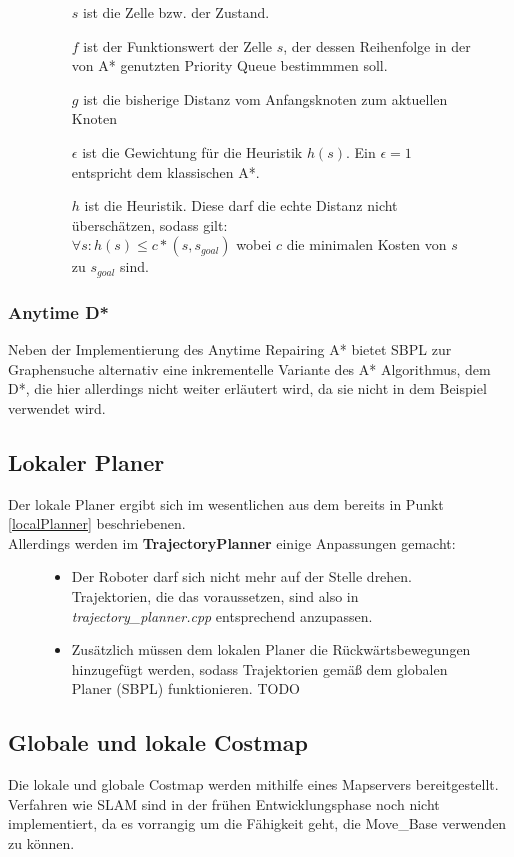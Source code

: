 \documentclass[oribibl]{llncs}
\begin{document}
\begin{figure}
\begin{itemize}
\item [$s$] ist die Zelle bzw. der Zustand.
\item [$f$] ist der Funktionswert der Zelle $s$, der dessen Reihenfolge in der von A* genutzten Priority Queue bestimmmen soll.
\item [$g$] ist die bisherige Distanz vom Anfangsknoten zum aktuellen Knoten
\item [$\epsilon$] ist die Gewichtung für die Heuristik $h(s)$. Ein $\epsilon = 1$ entspricht dem klassischen A*.
\item [$h$] ist die Heuristik. Diese darf die echte Distanz nicht überschätzen, sodass gilt:\\
$\forall s: h(s) \le c*(s,s_{goal})$ wobei $c$ die minimalen Kosten von $s$ zu $s_{goal}$ sind.
\end{itemize}
\end{figure}
\subsubsection{Anytime D*}
Neben der Implementierung des Anytime Repairing A* bietet SBPL zur Graphensuche alternativ eine inkrementelle Variante des A* Algorithmus, dem D*, die hier allerdings nicht weiter erläutert wird, da sie nicht in dem Beispiel verwendet wird.

\subsection{Lokaler Planer}
Der lokale Planer ergibt sich im wesentlichen aus dem bereits in Punkt \ref{localPlanner} beschriebenen.\\
Allerdings werden im \textbf{TrajectoryPlanner} einige Anpassungen gemacht:
\begin{figure}
\begin{itemize}
\item Der Roboter darf sich nicht mehr auf der Stelle drehen. Trajektorien, die das voraussetzen, sind also in \textit{trajectory\_planner.cpp} entsprechend anzupassen.
\item Zusätzlich müssen dem lokalen Planer die Rückwärtsbewegungen hinzugefügt werden, sodass Trajektorien gemäß dem globalen Planer (SBPL) funktionieren. TODO
\end{itemize}
\end{figure}
\subsection{Globale und lokale Costmap}
Die lokale und globale Costmap werden mithilfe eines Mapservers bereitgestellt.
Verfahren wie SLAM sind in der frühen Entwicklungsphase noch nicht implementiert, da es vorrangig um die Fähigkeit geht, die Move\_Base verwenden zu können.
\end{document}
